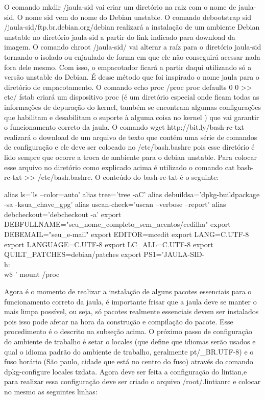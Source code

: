 O comando mkdir /jaula-sid vai criar um diretório na raiz com o nome de jaula-sid. O nome sid vem do nome do Debian unstable. O comando debootstrap sid /jaula-sid/ftp.br.debian.org/debian realizará a instalação de um ambiente Debian unstable no diretório jaula-sid a partir do link indicado para download da imagem. O comando chroot /jaula-sid/ vai alterar a raíz para o diretório jaula-sid tornando-o isolado ou enjaulado de forma em que ele não conseguirá acessar nada fora dele mesmo. Com isso, o empacotador ficará a partir daqui utilizando só a versão unstable do Debian. É desse método que foi inspirado o nome jaula para o diretório de empacotamento. O comando echo proc /proc proc defaults 0 0 >> etc/ fstab  criará um dispositivo proc (é um diretório especial onde ficam todas as informações de depuração do kernel, também se encontram algumas configurações que habilitam e desabilitam o suporte à alguma coisa no kernel ) que vai garantir o funcionamento correto da jaula. O comando wget http://bit.ly/bash-rc-txt realizará o download de um arquivo de texto que contém uma série de comandos de configuração e ele deve ser colocado no /etc/bash.bashrc pois esse diretório é lido sempre que ocorre a troca de ambiente para o debian unstable. Para colocar esse arquivo no diretório como explicado acima é utilizado o comando cat bash-rc-txt >> /etc/bash.bashrc. O conteúdo do bash-rc-txt é o seguinte:

alias ls='ls --color=auto' 
alias tree='tree -aC' 
alias debuildsa='dpkg-buildpackage -sa -ksua\_chave\_gpg' 
alias uscan-check='uscan --verbose --report' 
alias debcheckout='debcheckout -a' 
export DEBFULLNAME="seu\_nome\_completo\_sem\_acentos/cedilha" 
export DEBEMAIL="seu\_e-mail" export EDITOR=mcedit export LANG=C.UTF-8 export LANGUAGE=C.UTF-8 
export LC\_ALL=C.UTF-8 
export QUILT\_PATCHES=debian/patches 
export PS1='JAULA-SID-\u@\\h:\\w\$ ' 
mount /proc 

Agora é o momento de realizar a instalação de alguns pacotes essenciais para o funcionamento correto da jaula, é importante frisar que a jaula deve se manter o mais limpa possível, ou seja, só pacotes realmente essenciais devem ser instalados pois isso pode afetar na hora da construção e compilação do pacote. Esse procedimento é o descrito na subseção acima. O próximo passo de configuração do ambiente de trabalho é setar o locales (que define que idiomas serão usados e qual o idioma padrão do ambiente de trabalho, geralmente pt/\_BR.UTF-8) e o fuso horário (São paulo, cidade que está no centro do fuso) através do comando dpkg-configure locales tzdata. Agora deve ser feita a configuração do lintian,e para realizar essa configuração deve ser criado o arquivo /root/.lintianrc e colocar no mesmo as seguintes linhas: 

